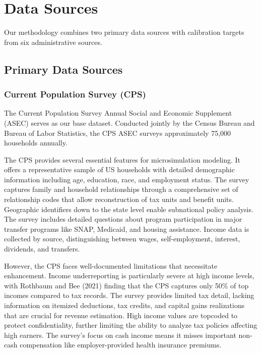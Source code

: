 \section{Data Sources}

Our methodology combines two primary data sources with calibration targets from six administrative sources.

\subsection{Primary Data Sources}

\subsubsection{Current Population Survey (CPS)}

The Current Population Survey Annual Social and Economic Supplement (ASEC) serves as our base dataset. Conducted jointly by the Census Bureau and Bureau of Labor Statistics, the CPS ASEC surveys approximately 75,000 households annually.

The CPS provides several essential features for microsimulation modeling. It offers a representative sample of US households with detailed demographic information including age, education, race, and employment status. The survey captures family and household relationships through a comprehensive set of relationship codes that allow reconstruction of tax units and benefit units. Geographic identifiers down to the state level enable subnational policy analysis. The survey includes detailed questions about program participation in major transfer programs like SNAP, Medicaid, and housing assistance. Income data is collected by source, distinguishing between wages, self-employment, interest, dividends, and transfers.

However, the CPS faces well-documented limitations that necessitate enhancement. Income underreporting is particularly severe at high income levels, with Rothbaum and Bee (2021) finding that the CPS captures only 50\% of top incomes compared to tax records. The survey provides limited tax detail, lacking information on itemized deductions, tax credits, and capital gains realizations that are crucial for revenue estimation. High income values are topcoded to protect confidentiality, further limiting the ability to analyze tax policies affecting high earners. The survey's focus on cash income means it misses important non-cash compensation like employer-provided health insurance premiums.

